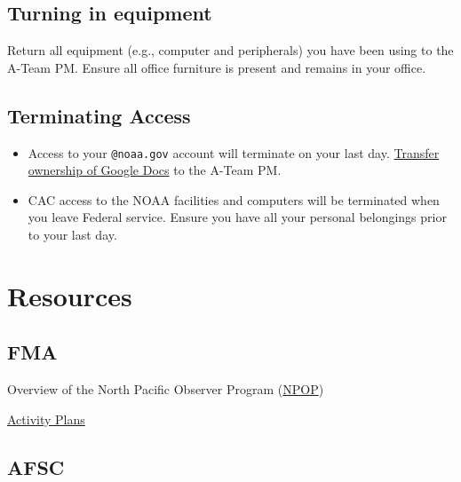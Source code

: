 \documentclass[
  letterpaper,
  DIV=11,
  numbers=noendperiod]{scrreprt}
\begin{document}
\hypertarget{turning-in-equipment}{%
\section{Turning in equipment}\label{turning-in-equipment}}

Return all equipment (e.g., computer and peripherals) you have been
using to the A-Team PM. Ensure all office furniture is present and
remains in your office.

\hypertarget{terminating-access}{%
\section{Terminating Access}\label{terminating-access}}

\begin{itemize}
\item
  Access to your \texttt{@noaa.gov} account will terminate on your last
  day.
  \href{https://support.google.com/docs/answer/2494892?hl=en\&co=GENIE.Platform\%3DDesktop}{Transfer
  ownership of Google Docs} to the A-Team PM.
\item
  CAC access to the NOAA facilities and computers will be terminated
  when you leave Federal service. Ensure you have all your personal
  belongings prior to your last day.
\end{itemize}


\hypertarget{sec-resources}{%
\chapter{Resources}\label{sec-resources}}

\hypertarget{fma}{%
\section{FMA}\label{fma}}

Overview of the North Pacific Observer Program
(\href{https://www.fisheries.noaa.gov/alaska/fisheries-observers/north-pacific-observer-program}{NPOP})

\href{https://drive.google.com/drive/folders/1LzUtltFG2Z-vLy5vbFF0dkA6B4bQOHh9}{Activity
Plans}

\hypertarget{afsc}{%
\section{AFSC}\label{afsc}}
\end{document}
